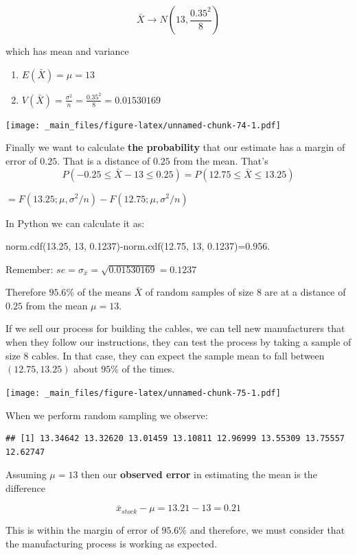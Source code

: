 \documentclass[
]{book}
\providecommand{\tightlist}{%
  \setlength{\itemsep}{0pt}\setlength{\parskip}{0pt}}
\begin{document}
\[\bar{X} \rightarrow N(13, \frac{0.35^2}{8})\]

which has mean and variance

\begin{enumerate}
\def\labelenumi{\arabic{enumi})}
\tightlist
\item
  \(E(\bar{X})=\mu=13\)
\item
  \(V(\bar{X})=\frac{\sigma^2}{n}=\frac{0.35^2}{8}=0.01530169\)
\end{enumerate}

\texttt{[image: \_main\_files/figure-latex/unnamed-chunk-74-1.pdf]}

Finally we want to calculate \textbf{the probability} that our estimate has a margin of error of \(0.25\). That is a distance of \(0.25\) from the mean. That's \[P(-0.25 \leq \bar{X} - 13\leq 0.25)=P(12.75 \leq \bar{X} \leq 13.25)\]

\(=F(13.25; \mu, \sigma^2/n)-F(12.75; \mu, \sigma^2/n)\)

In Python we can calculate it as:

norm.cdf(13.25, 13, 0.1237)-norm.cdf(12.75, 13, 0.1237)=0.956.

Remember: \(se=\sigma_{\bar{x}}=\sqrt{0.01530169}=0.1237\)

Therefore \(95.6\%\) of the means \(\bar{X}\) of random samples of size \(8\) are at a distance of \(0.25\) from the mean \(\mu=13\).

If we sell our process for building the cables, we can tell new manufacturers that when they follow our instructions, they can test the process by taking a sample of size \(8\) cables. In that case, they can expect the sample mean to fall between \((12.75, 13.25)\) about \(95\%\) of the times.

\texttt{[image: \_main\_files/figure-latex/unnamed-chunk-75-1.pdf]}

When we perform random sampling we observe:

\begin{verbatim}
## [1] 13.34642 13.32620 13.01459 13.10811 12.96999 13.55309 13.75557 12.62747
\end{verbatim}

Assuming \(\mu=13\) then our \textbf{observed error} in estimating the mean is the difference

\[\bar{x}_{stock}-\mu=13.21-13=0.21\]

This is within the margin of error of \(95.6\%\) and therefore, we must consider that the manufacturing process is working as expected.
\end{document}
